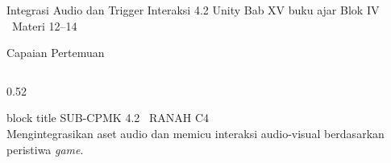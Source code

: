 \documentclass[aspectratio=169,10pt]{beamer}
\begin{document}
  {Integrasi Audio dan Trigger Interaksi}
  {4.2}
  {Unity}
  {Bab XV buku ajar}
  {Blok IV \textperiodcentered\ Materi 12--14}

\begin{frame}{Capaian Pertemuan}
\begin{columns}[T,onlytextwidth]
  \begin{column}{0.52\textwidth}
    \begin{beamercolorbox}[wd=\linewidth,sep=5pt,rounded=true]{block title}
      {\fontsize{6.8}{8}\selectfont\color{ubHead}SUB-CPMK 4.2 \textperiodcentered\ RANAH C4}\\[2pt]
      {\footnotesize Mengintegrasikan aset audio dan memicu interaksi
       audio-visual berdasarkan peristiwa \emph{game}.}
    \end{beamercolorbox}
    \vspace{0.14cm}


\end{column}
\end{columns}
\end{frame}
\end{document}
